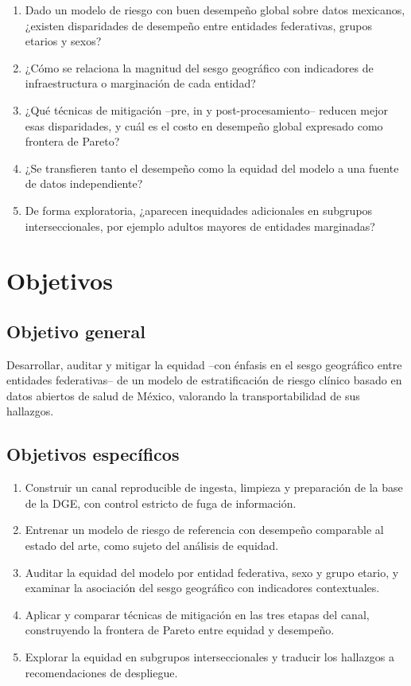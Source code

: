 \begin{enumerate}[label=P\arabic*., leftmargin=*]
  \item Dado un modelo de riesgo con buen desempeño global sobre datos
    mexicanos, ¿existen disparidades de desempeño entre entidades federativas,
    grupos etarios y sexos?
  \item ¿Cómo se relaciona la magnitud del sesgo geográfico con indicadores de
    infraestructura o marginación de cada entidad?
  \item ¿Qué técnicas de mitigación --pre, in y post-procesamiento-- reducen
    mejor esas disparidades, y cuál es el costo en desempeño global expresado
    como frontera de Pareto?
  \item ¿Se transfieren tanto el desempeño como la equidad del modelo a una
    fuente de datos independiente?
  \item De forma exploratoria, ¿aparecen inequidades adicionales en subgrupos
    interseccionales, por ejemplo adultos mayores de entidades marginadas?
\end{enumerate}

\section{Objetivos}

\subsection{Objetivo general}

Desarrollar, auditar y mitigar la equidad --con énfasis en el sesgo geográfico
entre entidades federativas-- de un modelo de estratificación de riesgo clínico
basado en datos abiertos de salud de México, valorando la transportabilidad de
sus hallazgos.

\subsection{Objetivos específicos}

\begin{enumerate}[label=OE\arabic*., leftmargin=*]
  \item Construir un canal reproducible de ingesta, limpieza y preparación de la
    base de la DGE, con control estricto de fuga de información.
  \item Entrenar un modelo de riesgo de referencia con desempeño comparable al
    estado del arte, como sujeto del análisis de equidad.
  \item Auditar la equidad del modelo por entidad federativa, sexo y grupo
    etario, y examinar la asociación del sesgo geográfico con indicadores
    contextuales.
  \item Aplicar y comparar técnicas de mitigación en las tres etapas del canal,
    construyendo la frontera de Pareto entre equidad y desempeño.
  \item Explorar la equidad en subgrupos interseccionales y traducir los
    hallazgos a recomendaciones de despliegue.
\end{enumerate}


